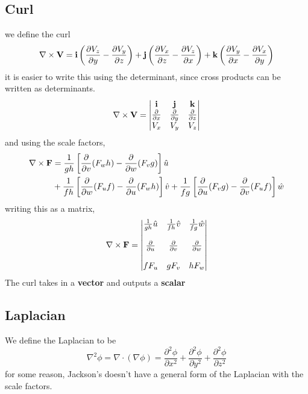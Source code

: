 \documentclass[oneside]{book}
\numberwithin{equation}{chapter} %
\newcommand{\pde}[2]{\ensuremath{%
		\frac{\partial #1}{\partial #2}}}
\begin{document}
\subsection{Curl}
we define the curl 
\begin{equation}
	\nabla\times\mathbf V=\mathbf i\left(\pde{V_z}y-\pde{V_y}z\right)+\mathbf j\left(\pde{V_x}z-\pde{V_z}x\right)+\mathbf k\left(\pde{V_y}x-\pde{V_x}y\right)
\end{equation}
it is easier to write this using the determinant, since cross products can be written as determinants. 
\begin{equation}
	\nabla\times\mathbf V=\begin{vmatrix}\mathbf i&\mathbf j&\mathbf k\\\pde{}{x}&\pde{}{y}&\pde{}{z}\\V_x&V_y&V_z\end{vmatrix}
\end{equation}
and using the scale factors,
\begin{align*}
	\nabla\times\mathbf F&=\frac 1{gh}\left[\pde{}{v}(F_wh)-\pde{}{w}(F_vg)\right]\hat u\\
	&+\frac 1{fh}\left[\pde{}{w}(F_uf)-\pde{}{u}(F_wh)\right]\hat v+\frac 1{fg}\left[\pde{}{u}(F_vg)-\pde{}{v}(F_uf)\right]\hat w
\end{align*}
writing this as a matrix,
\begin{equation}
	\nabla\times\mathbf F=
	\begin{vmatrix}
		\frac 1{gh}\hat u&\frac 1{fh}\hat v&\frac 1{fg}\hat w\\\\
		\pde{}{u}&\pde{}{v}&\pde{}{w}\\\\
		fF_u&gF_v&hF_w
	\end{vmatrix}
\end{equation}
The curl takes in a \textbf{vector} and outputs a \textbf{scalar}
\subsection{Laplacian}
We define the Laplacian to be 
\begin{equation}
	\nabla^2\phi=\nabla\cdot(\nabla\phi)=\frac{\partial^2\phi}{\partial x^2}+\frac{\partial^2\phi}{\partial y^2}+\frac{\partial^2\phi}{\partial z^2}
\end{equation}
for some reason, Jackson's doesn't have a general form of the Laplacian with the scale factors. 
\end{document}
